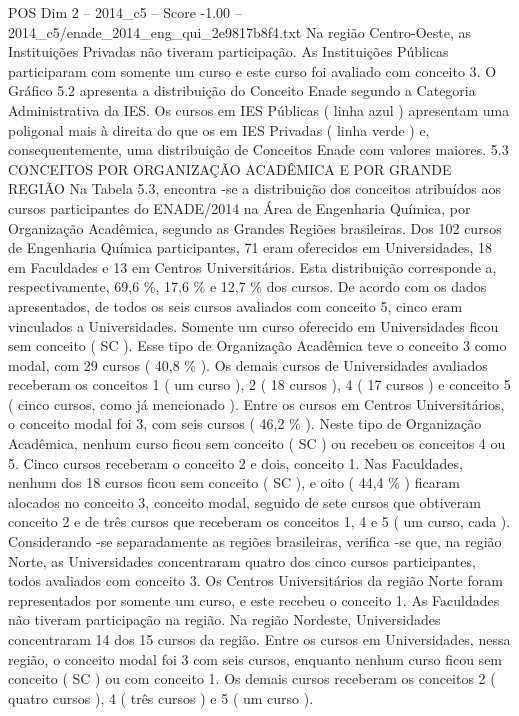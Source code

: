 \begin{textsample}{POS Dim 2 – 2014\_c5 – Score -1.00 – 2014\_c5/enade\_2014\_eng\_qui\_2e9817b8f4.txt}
Na região Centro-Oeste, as Instituições Privadas não tiveram participação.
As Instituições Públicas participaram com somente um curso e este curso foi avaliado com conceito 3.
O Gráfico 5.2 apresenta a distribuição do Conceito Enade segundo a Categoria Administrativa da IES.
Os cursos em IES Públicas ( linha azul ) apresentam uma poligonal mais à direita do que os em IES Privadas ( linha verde ) e, consequentemente, uma distribuição de Conceitos Enade com valores maiores. 5.3 CONCEITOS POR ORGANIZAÇÃO ACADÊMICA E POR GRANDE REGIÃO Na Tabela 5.3, encontra -se a distribuição dos conceitos atribuídos aos cursos participantes do ENADE/2014 na Área de Engenharia Química, por Organização Acadêmica, segundo as Grandes Regiões brasileiras.
Dos 102 cursos de Engenharia Química participantes, 71 eram oferecidos em Universidades, 18 em Faculdades e 13 em Centros Universitários.
Esta distribuição corresponde a, respectivamente, 69,6 \%, 17,6 \% e 12,7 \% dos cursos.
De acordo com os dados apresentados, de todos os seis cursos avaliados com conceito 5, cinco eram vinculados a Universidades.
Somente um curso oferecido em Universidades ficou sem conceito ( SC ).
Esse tipo de Organização Acadêmica teve o conceito 3 como modal, com 29 cursos ( 40,8 \% ).
Os demais cursos de Universidades avaliados receberam os conceitos 1 ( um curso ), 2 ( 18 cursos ), 4 ( 17 cursos ) e conceito 5 ( cinco cursos, como já mencionado ).
Entre os cursos em Centros Universitários, o conceito modal foi 3, com seis cursos ( 46,2 \% ).
Neste tipo de Organização Acadêmica, nenhum curso ficou sem conceito ( SC ) ou recebeu os conceitos 4 ou 5.
Cinco cursos receberam o conceito 2 e dois, conceito 1.
Nas Faculdades, nenhum dos 18 cursos ficou sem conceito ( SC ), e oito ( 44,4 \% ) ficaram alocados no conceito 3, conceito modal, seguido de sete cursos que obtiveram conceito 2 e de três cursos que receberam os conceitos 1, 4 e 5 ( um curso, cada ).
Considerando -se separadamente as regiões brasileiras, verifica -se que, na região Norte, as Universidades concentraram quatro dos cinco cursos participantes, todos avaliados com conceito 3.
Os Centros Universitários da região Norte foram representados por somente um curso, e este recebeu o conceito 1.
As Faculdades não tiveram participação na região.
Na região Nordeste, Universidades concentraram 14 dos 15 cursos da região.
Entre os cursos em Universidades, nessa região, o conceito modal foi 3 com seis cursos, enquanto nenhum curso ficou sem conceito ( SC ) ou com conceito 1.
Os demais cursos receberam os conceitos 2 ( quatro cursos ), 4 ( três cursos ) e 5 ( um curso ).

\end{textsample}
